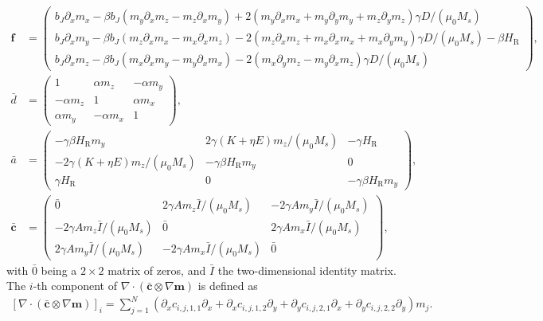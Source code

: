 \begin{subequations}
\begin{align}
\mathbold{f} &= 
 \begin{pmatrix}
  b_J\partial_x m_x - \beta b_J(m_y\partial_xm_z - m_z\partial_xm_y) + 2(m_y\partial_xm_x+m_y\partial_ym_y+m_z\partial_ym_z)\gamma D/(\mu_0M_s)\\
  b_J\partial_x m_y - \beta b_J(m_z\partial_xm_x-m_x\partial_xm_z)-2(m_z\partial_xm_z+m_x\partial_xm_x+m_x\partial_ym_y) \gamma D/(\mu_0M_s) -\beta H_{\text{R}}\\
  b_J\partial_xm_z - \beta b_J(m_x\partial_xm_y-m_y\partial_xm_x) - 2(m_x\partial_ym_z-m_y\partial_xm_z)\gamma D/(\mu_0M_s)
 \end{pmatrix}, \\
\bar{d} &= 
 \begin{pmatrix}
  1 & \alpha m_z & -\alpha m_y \\
  -\alpha m_z & 1 & \alpha m_x \\
  \alpha m_y & -\alpha m_x  & 1
 \end{pmatrix}, \\
 \bar{a} &= 
 \begin{pmatrix}
  -\gamma \beta H_{\text{R}} m_y & 2\gamma (K+\eta E) m_z/(\mu_0M_s) & -\gamma H_{\text{R}} \\
  -2\gamma (K+\eta E) m_z/(\mu_0M_s) & -\gamma\beta H_{\text{R}} m_y & 0 \\
  \gamma H_{\text{R}} & 0  & -\gamma \beta H_{\text{R}} m_y
 \end{pmatrix}, \\
  \mathbold{\bar{c}} &= 
 \begin{pmatrix}
  \bar{0} & 2\gamma Am_z\bar{I}/(\mu_0M_s) & -2\gamma Am_y\bar{I}/(\mu_0M_s) \\
  -2\gamma Am_z\bar{I}/(\mu_0M_s)  & \bar{0} & 2\gamma Am_x\bar{I}/(\mu_0M_s) \\
  2\gamma Am_y\bar{I}/(\mu_0M_s) & -2\gamma Am_x\bar{I}/(\mu_0M_s)  & \bar{0}
 \end{pmatrix},
\end{align}
\end{subequations}
with $\bar{0}$ being a $2\times 2$ matrix of zeros, and $\bar{I}$ the two-dimensional identity matrix. The $i$-th component of $\nabla\cdot(\mathbold{\bar{c}}\otimes\nabla \mathbold{m})$ is defined as
\begin{align}
    \left[\nabla\cdot(\mathbold{\bar{c}}\otimes\nabla \mathbold{m})\right]_i = \sum_{j=1}^{N}\left(\partial_xc_{i,j,1,1}\partial_x+\partial_xc_{i,j,1,2}\partial_y+\partial_yc_{i,j,2,1}\partial_x+\partial_yc_{i,j,2,2}\partial_y\right) m_j.
\end{align}

